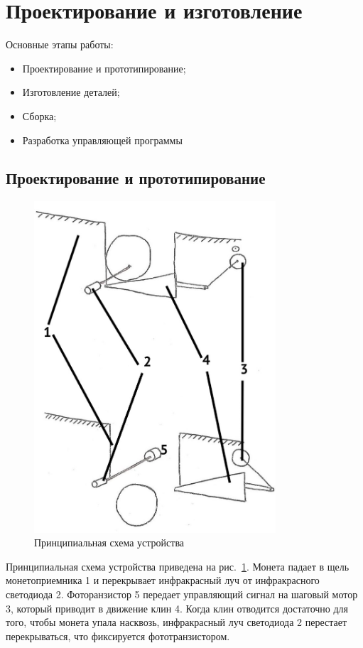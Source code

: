 \section {Проектирование и изготовление}

Основные этапы работы:

\begin{itemize}
	\item Проектирование и прототипирование; 
	\item Изготовление деталей;
	\item Сборка;
	\item Разработка управляющей программы
\end{itemize}

\subsection{Проектирование и прототипирование}

\begin{figure}[H]
	\centering
	\includegraphics[width=9cm]{pics/scheme_idea.jpg}
	\caption{Принципиальная схема устройства}
	\label{ris:scheme_idea}
\end{figure}
\par\medskip

Принципиальная схема устройства приведена на рис.~\ref{ris:scheme_idea}. Монета падает в щель монетоприемника 1 и перекрывает инфракрасный луч от инфракрасного светодиода 2. Фоторанзистор 5 передает управляющий сигнал на шаговый мотор 3, который приводит в движение клин 4. Когда клин отводится достаточно для того, чтобы монета упала насквозь, инфракрасный луч светодиода 2 перестает перекрываться, что фиксируется фототранзистором. 
\par\medskip

